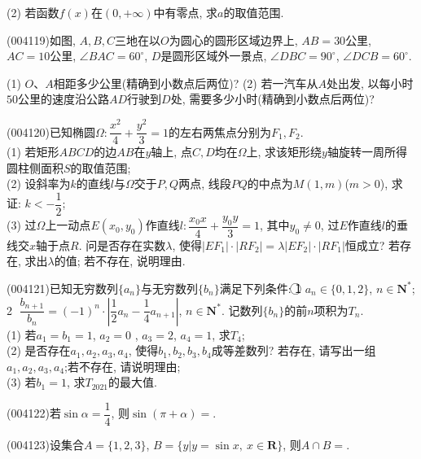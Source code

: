 (2) 若函数$f(x)$在$(0,+\infty)$中有零点, 求$a$的取值范围.
\item (004119)如图, $A,B,C$三地在以$O$为圆心的圆形区域边界上, $AB=30$公里, $AC=10$公里, $\angle BAC=60^\circ$, $D$是圆形区域外一景点, $\angle DBC=90^\circ$, $\angle DCB=60^\circ$.
\begin{center}
\end{center}
(1) $O$、$A$相距多少公里(精确到小数点后两位)?
(2) 若一汽车从$A$处出发, 以每小时$50$公里的速度沿公路$AD$行驶到$D$处, 需要多少小时(精确到小数点后两位)?
\item (004120)已知椭圆$\Omega :\dfrac{x^2}4+\dfrac{y^2}3=1$的左右两焦点分别为$F_1,F_2$.\\
(1) 若矩形$ABCD$的边$AB$在$y$轴上, 点$C,D$均在$\Omega$上, 求该矩形绕$y$轴旋转一周所得圆柱侧面积$S$的取值范围;\\
(2) 设斜率为$k$的直线$l$与$\Omega$交于$P,Q$两点, 线段$PQ$的中点为$M(1,m)$($m>0$), 求证: $k<-\dfrac 12$;\\
(3) 过$\Omega$上一动点$E(x_0,y_0)$作直线$l:\dfrac{x_0x}4+\dfrac{y_0y}3=1$, 其中$y_0\ne 0$, 过$E$作直线$l$的垂线交$x$轴于点$R$. 问是否存在实数$\lambda$, 使得$|EF_1|\cdot |RF_2|=\lambda |EF_2|\cdot |RF_1|$恒成立? 若存在, 求出$\lambda$的值; 若不存在, 说明理由.
\item (004121)已知无穷数列$\{a_n\}$与无穷数列$\{b_n\}$满足下列条件:
\textcircled{1} $a_n\in \{0,1,2\}$, $n\in \mathbf{N}^*$; \textcircled{2} $\dfrac{b_{n+1}}{b_n}=(-1)^n\cdot |\dfrac 12a_n-\dfrac 14a_{n+1}|$, $n\in \mathbf{N}^*$. 记数列$\{b_n\}$的前$n$项积为$T_n$.\\
(1) 若$a_1=b_1=1$, $a_2=0$ , $a_3=2$, $a_4=1$, 求$T_4$;\\
(2) 是否存在$a_1,a_2,a_3,a_4$, 使得$b_1,b_2,b_3,b_4$成等差数列? 若存在, 请写出一组$a_1,a_2,a_3,a_4$;若不存在, 请说明理由;\\
(3) 若$b_1=1$, 求$T_{2021}$的最大值.
\item (004122)若$\sin\alpha=\dfrac 14$, 则$\sin(\pi+\alpha)=$.
\item (004123)设集合$A=\{1,2,3\}$, $B=\{y|y=\sin x, \ x\in \mathbf{R}\}$, 则$A\cap B=$.
